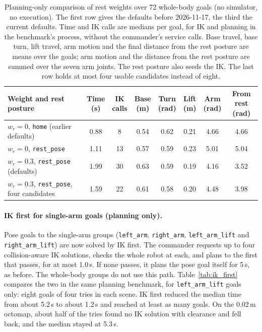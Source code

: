 \documentclass[12pt,a4paper]{article}
\begin{document}
\begin{table}[H]
    \centering
    \small
    \setlength{\tabcolsep}{3pt}
    \begin{tabular}{lccccccc}
        \toprule
        Weight and rest posture & \shortstack{Time\\(s)} & \shortstack{IK\\calls} & \shortstack{Base\\(m)}
        & \shortstack{Turn\\(rad)} & \shortstack{Lift\\(m)} & \shortstack{Arm\\(rad)}
        & \shortstack{From\\rest (rad)} \\
        \midrule
        $w_r=0$, \texttt{home} (earlier defaults)       & 0.88 & 8  & 0.54 & 0.62 & 0.21 & 4.66 & 4.66 \\
        $w_r=0$, \texttt{rest\_pose}                    & 1.11 & 13 & 0.57 & 0.59 & 0.23 & 5.01 & 5.04 \\
        $w_r=0.3$, \texttt{rest\_pose} (defaults)       & 1.99 & 30 & 0.63 & 0.59 & 0.19 & 4.16 & 3.52 \\
        $w_r=0.3$, \texttt{rest\_pose}, four candidates & 1.59 & 22 & 0.61 & 0.58 & 0.20 & 4.48 & 3.98 \\
        \bottomrule
    \end{tabular}
    \caption{\small{Planning-only comparison of rest weights over 72 whole-body goals (no simulator, no
    execution). The first row gives the defaults before 2026-11-17, the third the current defaults. Time and IK calls are medians per goal, for IK and planning in the benchmark's process,
    without the commander's service calls. Base travel, base turn, lift travel, arm motion and the final
    distance from the rest posture are means over the goals; arm motion and the distance from the rest
    posture are summed over the seven arm joints. The rest posture also seeds the IK. The last row holds
    at most four usable candidates instead of eight.}}
    \label{tab:rest_weight}
\end{table}

\paragraph{IK first for single-arm goals (planning only).}
Pose goals to the single-arm groups (\texttt{left\_arm}, \texttt{right\_arm}, \texttt{left\_arm\_lift} and
\texttt{right\_arm\_lift}) are now solved by IK first. The commander requests up to four collision-aware
IK solutions, checks the whole robot at each, and plans to the first that passes, for at most 1.0\,s.
If none passes, it plans the pose goal itself for 5\,s, as before. The whole-body groups do not use
this path. Table~\ref{tab:ik_first} compares the two in the same planning benchmark, for
\texttt{left\_arm\_lift} goals only: eight goals of four tries in each scene. IK first reduced the
median time from about 5.2\,s to about 1.2\,s and reached at least as many goals. On the 0.02\,m
octomap, about half of the tries found no IK solution with clearance and fell back, and the median
stayed at 5.3\,s.
\end{document}
